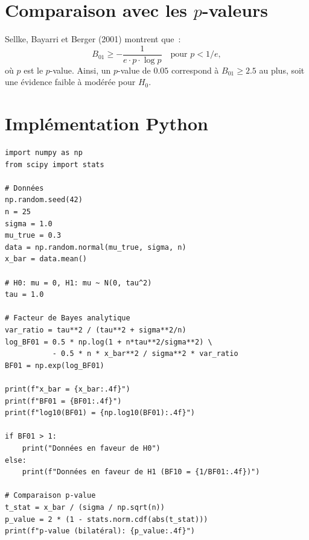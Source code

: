 \section{Comparaison avec les $p$-valeurs}

\begin{proposition}
Sellke, Bayarri et Berger (2001) montrent que~:
\[
  B_{01} \geq -\frac{1}{e \cdot p \cdot \log p}
  \quad \text{pour } p < 1/e,
\]
o\`u $p$ est le $p$-value. Ainsi, un $p$-value de $0.05$ correspond \`a
$B_{01} \geq 2.5$ au plus, soit une \'evidence faible \`a mod\'er\'ee
pour $H_0$.
\end{proposition}

\section{Impl\'ementation Python}

\begin{codeblock}[title=\textbf{Facteur de Bayes pour un test gaussien}]
\begin{verbatim}
import numpy as np
from scipy import stats

# Données
np.random.seed(42)
n = 25
sigma = 1.0
mu_true = 0.3
data = np.random.normal(mu_true, sigma, n)
x_bar = data.mean()

# H0: mu = 0, H1: mu ~ N(0, tau^2)
tau = 1.0

# Facteur de Bayes analytique
var_ratio = tau**2 / (tau**2 + sigma**2/n)
log_BF01 = 0.5 * np.log(1 + n*tau**2/sigma**2) \
           - 0.5 * n * x_bar**2 / sigma**2 * var_ratio
BF01 = np.exp(log_BF01)

print(f"x_bar = {x_bar:.4f}")
print(f"BF01 = {BF01:.4f}")
print(f"log10(BF01) = {np.log10(BF01):.4f}")

if BF01 > 1:
    print("Données en faveur de H0")
else:
    print(f"Données en faveur de H1 (BF10 = {1/BF01:.4f})")

# Comparaison p-value
t_stat = x_bar / (sigma / np.sqrt(n))
p_value = 2 * (1 - stats.norm.cdf(abs(t_stat)))
print(f"p-value (bilatéral): {p_value:.4f}")
\end{verbatim}
\end{codeblock}

